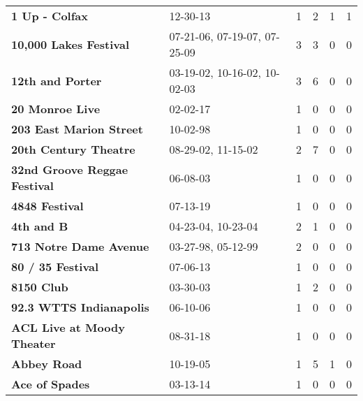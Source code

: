\begin{supertabular}{llllll}
                                               \textbf{1 Up - Colfax} &                      12-30-13 &  1 &   2 &  1 &  1 \\
                                       \textbf{10,000 Lakes Festival} &  07-21-06, 07-19-07, 07-25-09 &  3 &   3 &  0 &  0 \\
                                             \textbf{12th and Porter} &  03-19-02, 10-16-02, 10-02-03 &  3 &   6 &  0 &  0 \\
                                              \textbf{20 Monroe Live} &                      02-02-17 &  1 &   0 &  0 &  0 \\
                                      \textbf{203 East Marion Street} &                      10-02-98 &  1 &   0 &  0 &  0 \\
                                        \textbf{20th Century Theatre} &            08-29-02, 11-15-02 &  2 &   7 &  0 &  0 \\
                                 \textbf{32nd Groove Reggae Festival} &                      06-08-03 &  1 &   0 &  0 &  0 \\
                                               \textbf{4848 Festival} &                      07-13-19 &  1 &   0 &  0 &  0 \\
                                                   \textbf{4th and B} &            04-23-04, 10-23-04 &  2 &   1 &  0 &  0 \\
                                       \textbf{713 Notre Dame Avenue} &            03-27-98, 05-12-99 &  2 &   0 &  0 &  0 \\
                                            \textbf{80 / 35 Festival} &                      07-06-13 &  1 &   0 &  0 &  0 \\
                                                   \textbf{8150 Club} &                      03-30-03 &  1 &   2 &  0 &  0 \\
                                      \textbf{92.3 WTTS Indianapolis} &                      06-10-06 &  1 &   0 &  0 &  0 \\
                                   \textbf{ACL Live at Moody Theater} &                      08-31-18 &  1 &   0 &  0 &  0 \\
                                                  \textbf{Abbey Road} &                      10-19-05 &  1 &   5 &  1 &  0 \\
                                               \textbf{Ace of Spades} &                      03-13-14 &  1 &   0 &  0 &  0 \\

\end{supertabular}
